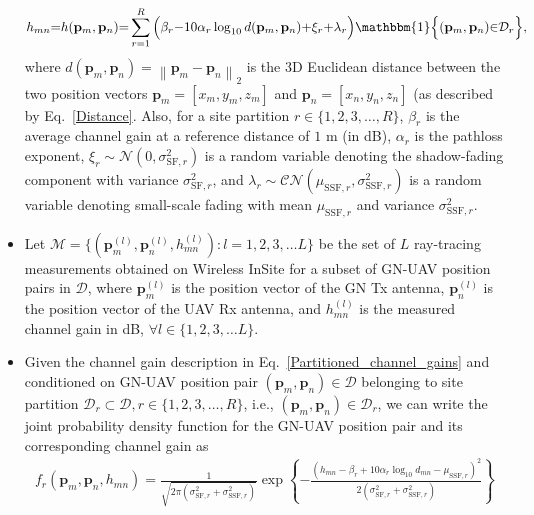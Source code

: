 \documentclass{article}
\newcommand{\norm}[1]{\left\lVert#1\right\rVert}
\begin{document}
\begin{itemize}
    \begin{align}\label{Partitioned_channel_gains}
        h_{mn}{=}h(\mathbf{p}_{m},\mathbf{p}_{n}){=}\sum_{r{=}1}^{R}\Big(\beta_{r}{-}10\alpha_{r}\log_{10}d(\mathbf{p}_{m},\mathbf{p}_{n}){+}\xi_{r}{+}\lambda_{r}\Big)\mathbbm{1}\Big\{(\mathbf{p}_{m},\mathbf{p}_{n}){\in}\mathcal{D}_{r}\Big\},
    \end{align}
    where $d(\mathbf{p}_{m},\mathbf{p}_{n}){=}\norm{\mathbf{p}_{m}{-}\mathbf{p}_{n}}_{2}$ is the $3$D Euclidean distance between the two position vectors $\mathbf{p}_{m}{=}[x_{m},y_{m},z_{m}]$ and $\mathbf{p}_{n}{=}[x_{n},y_{n},z_{n}]$ (as described by Eq.~\eqref{Distance}. Also, for a site partition $r{\in}\{1,2,3,{\dots},R\}$, $\beta_{r}$ is the average channel gain at a reference distance of $1$ m (in dB), $\alpha_{r}$ is the pathloss exponent, $\xi_{r}{\sim}\mathcal{N}\left(0,\sigma_{\mathrm{SF},r}^{2}\right)$ is a random variable denoting the shadow-fading component with variance $\sigma_{\mathrm{SF},r}^{2}$, and $\lambda_{r}{\sim}\mathcal{CN}\left(\mu_{\mathrm{SSF},r},\sigma_{\mathrm{SSF},r}^{2}\right)$ is a random variable denoting small-scale fading with mean $\mu_{\mathrm{SSF},r}$ and variance $\sigma_{\mathrm{SSF},r}^{2}$.
    \item Let $\mathcal{M}{=}\Big\{\left(\mathbf{p}_{m}^{(l)},\mathbf{p}_{n}^{(l)},h_{mn}^{(l)}\right):l{=}1,2,3,{\dots}L\Big\}$ be the set of $L$ ray-tracing measurements obtained on Wireless InSite for a subset of GN-UAV position pairs in $\mathcal{D}$, where $\mathbf{p}_{m}^{(l)}$ is the position vector of the GN Tx antenna, $\mathbf{p}_{n}^{(l)}$ is the position vector of the UAV Rx antenna, and $h_{mn}^{(l)}$ is the measured channel gain in dB, ${\forall}l{\in}\{1,2,3,{\dots}L\}$.
    \item Given the channel gain description in Eq.~\eqref{Partitioned_channel_gains} and conditioned on GN-UAV position pair $\left(\mathbf{p}_{m},\mathbf{p}_{n}\right){\in}\mathcal{D}$ belonging to site partition $\mathcal{D}_{r}{\subset}\mathcal{D},r{\in}\{1,2,3,{\dots},R\}$, i.e., $\left(\mathbf{p}_{m},\mathbf{p}_{n}\right){\in}\mathcal{D}_{r}$, we can write the joint probability density function for the GN-UAV position pair and its corresponding channel gain as
    \begin{align}\label{Conditioned_joint_pdf}
        f_{r}\left(\mathbf{p}_{m},\mathbf{p}_{n},h_{mn}\right){=}\frac{1}{\sqrt{2\pi \left(\sigma_{\mathrm{SF},r}^{2}{+}\sigma_{\mathrm{SSF},r}^{2}\right)}}\exp\left\{-\frac{\left(h_{mn}{-}\beta_{r}{+}10\alpha_{r}\log_{10}d_{mn}{-}\mu_{\mathrm{SSF},r}\right)^{2}}{2\left(\sigma_{\mathrm{SF},r}^{2}{+}\sigma_{\mathrm{SSF},r}^{2}\right)}\right\}

\end{align}
\end{itemize}
\end{document}
